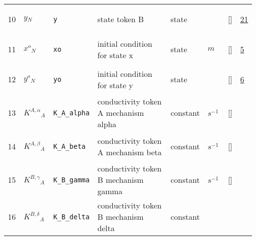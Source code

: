 \begin{longtable}{|p{1cm}|p{3cm}|p{3cm}|p{7cm}|p{3.0cm}|p{3cm}|p{2cm}|p{1cm}|}
                 \\
    10
             & \hypertarget{"v:10"}{ $ {y}{_{N}} $}
             & \verb|y|
             & state token B
             & \begin{lay}state \end{lay}
             & $  $
             & []
             & \hyperlink{"e:21"}{ 21 }
                 \\
    11
             & \hypertarget{"v:11"}{ $ {{x^o}}{_{N}} $}
             & \verb|xo|
             & initial condition for state x
             & \begin{lay}state \end{lay}
             & $ m  $
             & []
             & \hyperlink{"e:5"}{ 5 }
                 \\
    12
             & \hypertarget{"v:12"}{ $ {{y^o}}{_{N}} $}
             & \verb|yo|
             & initial condition for state y
             & \begin{lay}state \end{lay}
             & $  $
             & []
             & \hyperlink{"e:6"}{ 6 }
                 \\
    13
             & \hypertarget{"v:13"}{ $ {{K^{A,\alpha}}}{_{A}} $}
             & \verb|K_A_alpha|
             & conductivity token A mechanism alpha 
             & \begin{lay}constant \end{lay}
             & $ s^{-1} \, $
             & []
             & \\
    14
             & \hypertarget{"v:14"}{ $ {{K^{A,\beta}}}{_{A}} $}
             & \verb|K_A_beta|
             & conductivity token A mechanism beta
             & \begin{lay}constant \end{lay}
             & $ s^{-1} \, $
             & []
             & \\
    15
             & \hypertarget{"v:15"}{ $ {{K^{B,\gamma}}}{_{A}} $}
             & \verb|K_B_gamma|
             & conductivity token B mechanism gamma
             & \begin{lay}constant \end{lay}
             & $ s^{-1} \, $
             & []
             & \\
    16
             & \hypertarget{"v:16"}{ $ {{K^{B,\delta}}}{_{A}} $}
             & \verb|K_B_delta|
             & conductivity token B mechanism delta
             & \begin{lay}constant \end{lay}

\end{longtable}
